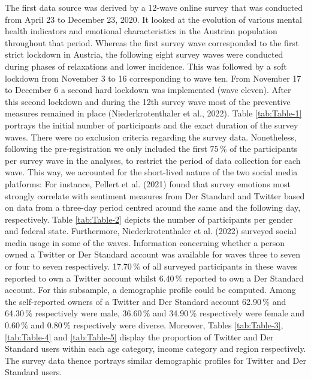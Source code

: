 \documentclass[
  english,
  jou,floatsintext]{apa7}
\begin{document}
The first data source was derived by a 12-wave online survey that was conducted from April 23 to December 23, 2020. It looked at the evolution of various mental health indicators and emotional characteristics in the Austrian population throughout that period. Whereas the first survey wave corresponded to the first strict lockdown in Austria, the following eight survey waves were conducted during phases of relaxations and lower incidence. This was followed by a soft lockdown from November 3 to 16 corresponding to wave ten. From November 17 to December 6 a second hard lockdown was implemented (wave eleven). After this second lockdown and during the 12th survey wave most of the preventive measures remained in place (Niederkrotenthaler et al., 2022). Table \ref{tab:Table-1} portrays the initial number of participants and the exact duration of the survey waves. There were no exclusion criteria regarding the survey data. Nonetheless, following the pre-registration we only included the first \(75\,\%\) of the participants per survey wave in the analyses, to restrict the period of data collection for each wave. This way, we accounted for the short-lived nature of the two social media platforms: For instance, Pellert et al. (2021) found that survey emotions most strongly correlate with sentiment measures from Der Standard and Twitter based on data from a three-day period centred around the same and the following day, respectively. Table \ref{tab:Table-2} depicts the number of participants per gender and federal state.
Furthermore, Niederkrotenthaler et al. (2022) surveyed social media usage in some of the waves. Information concerning whether a person owned a Twitter or Der Standard account was available for waves three to seven or four to seven respectively. 17.70\(\,\%\) of all surveyed participants in these waves reported to own a Twitter account whilst 6.40\(\,\%\) reported to own a Der Standard account. For this subsample, a demographic profile could be computed. Among the self-reported owners of a Twitter and Der Standard account 62.90\(\,\%\) and 64.30\(\,\%\) respectively were male, 36.60\(\,\%\) and 34.90\(\,\%\) respectively were female and 0.60\(\,\%\) and 0.80\(\,\%\) respectively were diverse. Moreover, Tables \ref{tab:Table-3}, \ref{tab:Table-4} and \ref{tab:Table-5} display the proportion of Twitter and Der Standard users within each age category, income category and region respectively. The survey data thence portrays similar demographic profiles for Twitter and Der Standard users.
\end{document}

